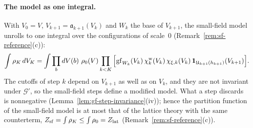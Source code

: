 \paragraph{The model as one integral.} With $V_0=V$, $V_{k+1}=\mathfrak a_{k+1}(V_k)$ and $W_k$ the base of $V_{k+1}$, the small-field model unrolls to one integral over the configurations of scale~$0$ (Remark~\ref{rem:sf-reference}(c)):
\[
\int\rho_K\,dV_K=\int\prod_bdV(b)\ \rho_0(V)\prod_{k<K}\Big[\mathrm{gf}_{W_k}(V_k)\,\chi^{\rm w}_k(V_k)\,\chi_{\xi,k}(V_k)\,\one_{\mathfrak U_{k+1}(h_{k+1})}(V_{k+1})\Big].
\]
The cutoffs of step $k$ depend on $V_{k+1}$ as well as on $V_k$, and they are not invariant under $\mathcal G'$, so the small-field steps define a modified model. What a step discards is nonnegative (Lemma~\ref{lem:gf-step-invariance}(iv)); hence the partition function of the small-field model is at most that of the lattice theory with the same counterterm, $Z_{\rm sf}=\int\rho_K\le\int\rho_0=Z_{\rm lat}$ (Remark~\ref{rem:sf-reference}(c)).


